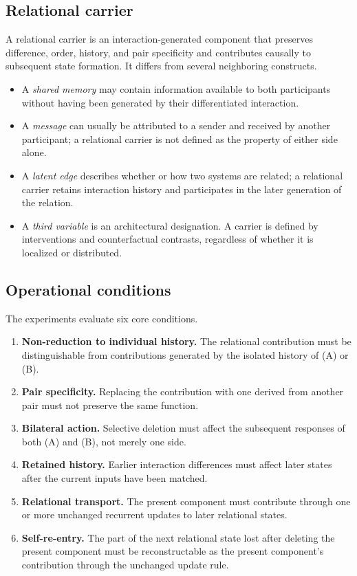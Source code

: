 \documentclass[11pt,a4paper]{article}
\begin{document}
\subsection{Relational carrier}

A relational carrier is an interaction-generated component that preserves difference, order, history, and pair specificity and contributes causally to subsequent state formation. It differs from several neighboring constructs.

\begin{itemize}
  \item A \emph{shared memory} may contain information available to both participants without having been generated by their differentiated interaction.
  \item A \emph{message} can usually be attributed to a sender and received by another participant; a relational carrier is not defined as the property of either side alone.
  \item A \emph{latent edge} describes whether or how two systems are related; a relational carrier retains interaction history and participates in the later generation of the relation.
  \item A \emph{third variable} is an architectural designation. A carrier is defined by interventions and counterfactual contrasts, regardless of whether it is localized or distributed.
\end{itemize}

\subsection{Operational conditions}

The experiments evaluate six core conditions.

\begin{enumerate}
  \item \textbf{Non-reduction to individual history.} The relational contribution must be distinguishable from contributions generated by the isolated history of (A) or (B).
  \item \textbf{Pair specificity.} Replacing the contribution with one derived from another pair must not preserve the same function.
  \item \textbf{Bilateral action.} Selective deletion must affect the subsequent responses of both (A) and (B), not merely one side.
  \item \textbf{Retained history.} Earlier interaction differences must affect later states after the current inputs have been matched.
  \item \textbf{Relational transport.} The present component must contribute through one or more unchanged recurrent updates to later relational states.
  \item \textbf{Self-re-entry.} The part of the next relational state lost after deleting the present component must be reconstructable as the present component's contribution through the unchanged update rule.
\end{enumerate}
\end{document}
